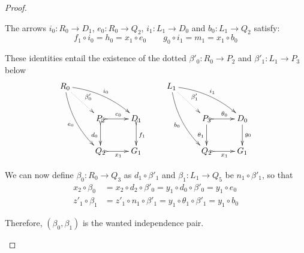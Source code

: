 \documentclass[a4paper,UKenglish,cleveref,pdftex,thm-restate,numberwithinsect,anonymous]{lipics}
\begin{document}
\begin{proof}
\begin{enumerate}
		The arrows $i_0\colon R_0\to D_1$,
		$e_0\colon R_0\to Q_2$, $i_1\colon L_1\to D_0$ and $b_0\colon L_1 \to Q_2$ satisfy:
		\[
		f_1\circ i_0  = h_0 =x_1\circ e_0 \qquad 
		g_0\circ i_1 = m_1 = x_1 \circ b_0 \]

		These identities entail the existence of the dotted
		$\beta'_0\colon R_0\to P_2$ and $\beta'_1\colon L_1\to P_3$ below
		\[\xymatrix{R_0 \ar@{.>}[dr]^{\beta'_0} \ar@/^.3cm/[drr]^{i_0}
			\ar@/_.3cm/[ddr]_{e_0} &&& L_1 \ar@{.>}[dr]^{\beta'_1} \ar@/^.3cm/[drr]^{i_1}
			\ar@/_.3cm/[ddr]_{b_0}\\ &P_2 \ar@{>->}[r]^{c_0} \ar@{>->}[d]_{d_0}& D_1
			\ar@{>->}[d]^{f_1} & &P_3 \ar@{>->}[r]^{\theta_0} \ar[d]_{\theta_1}& D_0 \ar[d]^{g_0}\\ &Q_2\ar@{>->}[r]_{x_1} & G_1 & &Q_2\ar@{>->}[r]_{x_1} & G_1}\]
	
	We can now define $\beta_0\colon R_0\to Q_3$ as $d_1\circ \beta'_1$ and $\beta_1\colon L_1\to Q_5$ be $n_1\circ \beta'_1$, so that
		\begin{align*}
			x_2\circ \beta_0 & =x_2\circ d_2\circ \beta'_0 = y_1\circ d_0\circ \beta'_0=y_1\circ e_0\\
			z'_1 \circ \beta_1 & = z'_1 \circ n_1\circ \beta'_1 =y_1\circ \theta_1\circ \beta'_1=y_1\circ b_0
		\end{align*}
	
		Therefore, $(\beta_0, \beta_1)$ is the wanted independence pair.
		

\end{enumerate}
\end{proof}
\end{document}
